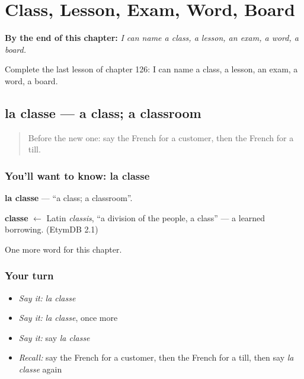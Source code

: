 
\chapter{Class, Lesson, Exam, Word, Board}
\label{ch:fr-class-lesson-exam-word-board}

\begin{chapteropening}
\textbf{By the end of this chapter:} \emph{I can name a class, a lesson, an exam, a word, a board.}

Complete the last lesson of chapter 126: I can name a class, a lesson, an exam, a word, a board.
\end{chapteropening}

\section[la classe]{la classe — a class; a classroom}

\label{lesson:FR-C126-classe}



\begin{quote}
Before the new one: say the French for a customer, then the French for a till.
\end{quote}

\subsection*{You'll want to know: la classe}
\textbf{la classe} — \textquotedblleft{}a class; a classroom\textquotedblright{}.

\begin{cousinweb}
\textbf{classe} $\leftarrow$ Latin \emph{classis}, \textquotedblleft{}a division of the people, a class\textquotedblright{} — a learned borrowing. (EtymDB 2.1)
\end{cousinweb}

\begin{grammarlens}[title={What you've built}]
One more word for this chapter.
\end{grammarlens}

\subsection*{Your turn}
\begin{itemize}
\raggedright
  \item \emph{Say it:} \emph{la classe}
  \item \emph{Say it:} \emph{la classe}, once more
  \item \emph{Say it:} say \emph{la classe}
  \item \emph{Recall:} say the French for a customer, then the French for a till, then say \emph{la classe} again
\end{itemize}

